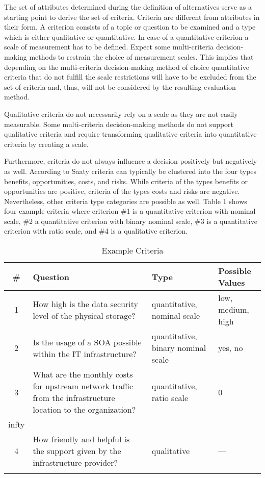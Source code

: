 \documentclass[journal,final,a4paper,twoside]{IEEEtran}
\begin{document}
The set of attributes determined during the definition of alternatives serve as a starting point to derive the set of criteria. Criteria are different from attributes in their form. A criterion consists of a topic or question to be examined and a type which is either qualitative or quantitative. 
In case of a quantitative criterion a scale of measurement has to be defined. Expect some multi-criteria decision-making methods to restrain the choice of measurement scales. This implies that depending on the multi-criteria decision-making method of choice quantitative criteria that do not fulfill the scale restrictions will have to be excluded from the set of criteria and, thus, will not be considered by the resulting evaluation method. 

Qualitative criteria do not necessarily rely on a scale as they are not easily measurable. Some multi-criteria decision-making methods do not support qualitative criteria and require transforming qualitative criteria into quantitative criteria by creating a scale.

Furthermore, criteria do not always influence a decision positively but negatively as well. According to Saaty \cite{saatybook2005} criteria can typically be clustered into the four types benefits, opportunities, costs, and risks. While criteria of the types benefits or opportunities are positive, criteria of the types costs and risks are negative. Nevertheless, other criteria type categories are possible as well.
Table 1 shows four example criteria where criterion \#1 is a quantitative criterion with nominal scale, \#2 a quantitative criterion with binary nominal scale, \#3 is a quantitative criterion with ratio scale, and \#4 is a qualitative criterion.
\begin{table}[!t]
\renewcommand{\arraystretch}{1.3}
\caption{Example Criteria}
\label{table_examplecriteria}
\centering
\begin{tabular}{| c | m{1in} | m{.7in} | m{.5in} |}
\firsthline
\# & Question & Type & Possible Values\\
\hline
1 & How high is the data security level of the physical storage? & quantitative, nominal scale & low, medium, high \\
\hline
2 & Is the usage of a SOA possible within the IT infrastructure? & quantitative, binary nominal scale & yes, no \\
\hline
3 & What are the monthly costs for upstream network traffic from the infrastructure location to the organization? & quantitative, ratio scale & 0\\infty \\
\hline
4 & How friendly and helpful is the support given by the infrastructure provider? & qualitative & --- \\
\lasthline
\end{tabular}
\end{table}
\end{document}
